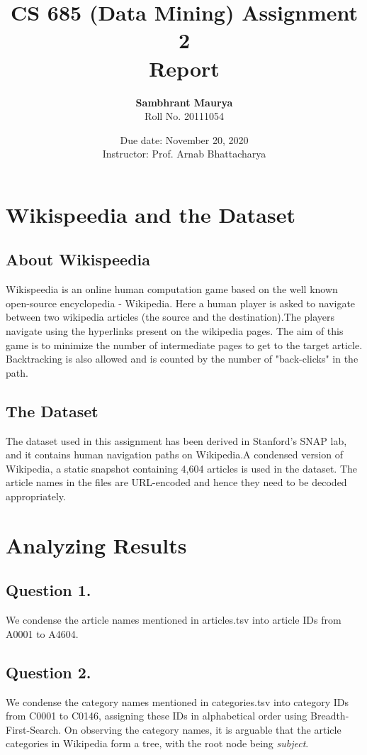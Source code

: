 \documentclass{article}
\title{CS 685 (Data Mining)
Assignment 2 \\ Report}
\author{\textbf{Sambhrant Maurya} \\ Roll No. 20111054}
\date{Due date: November 20, 2020 \\ Instructor: Prof. Arnab Bhattacharya}
\begin{document}
\maketitle
\pagebreak
\lstset{style=mystyle}
\section{Wikispeedia and the Dataset}
\subsection{About Wikispeedia}
Wikispeedia is an online human computation game based on the well known open-source encyclopedia - Wikipedia. Here a human player is asked to navigate between two wikipedia articles (the source and the destination).The players navigate using the hyperlinks present on the wikipedia pages. The aim of this game is to minimize the number of intermediate pages to get to the target article. Backtracking is also allowed and is counted by the number of "back-clicks" in the path.

\subsection{The Dataset}
The dataset used in this assignment has been derived in Stanford's SNAP lab, and it contains human navigation paths on Wikipedia.A condensed version of Wikipedia, a static snapshot containing 4,604 articles is used in the dataset. The article names in the files are URL-encoded and hence they need to be decoded appropriately.

\section{Analyzing Results}
\subsection{Question 1.}
We condense the article names mentioned in articles.tsv into article IDs from A0001 to A4604.
\subsection{Question 2.}
We condense the category names mentioned in categories.tsv into category IDs from C0001 to C0146, assigning these IDs in alphabetical order using Breadth-First-Search. On observing the category names, it is arguable that the article categories in Wikipedia form a tree, with the root node being \textit{subject}.
\end{document}
